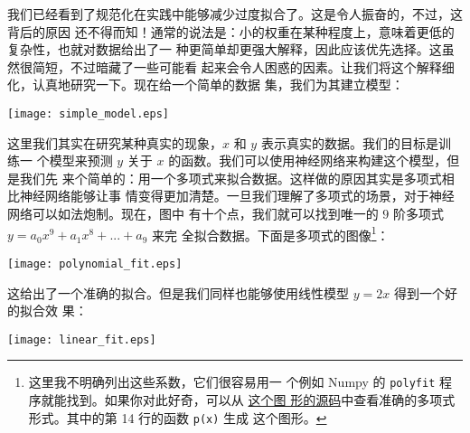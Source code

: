 %
%
% 

我们已经看到了规范化在实践中能够减少过度拟合了。这是令人振奋的，不过，这背后的原因
还不得而知！通常的说法是：小的权重在某种程度上，意味着更低的复杂性，也就对数据给出了一
种更简单却更强大解释，因此应该优先选择。这虽然很简短，不过暗藏了一些可能看
起来会令人困惑的因素。让我们将这个解释细化，认真地研究一下。现在给一个简单的数据
集，我们为其建立模型：
\begin{center}
	\texttt{[image: simple\_model.eps]}
\end{center}
	
这里我们其实在研究某种真实的现象，$x$ 和 $y$ 表示真实的数据。我们的目标是训练一
个模型来预测 $y$ 关于 $x$ 的函数。我们可以使用神经网络来构建这个模型，但是我们先
来个简单的：用一个多项式来拟合数据。这样做的原因其实是多项式相比神经网络能够让事
情变得更加清楚。一旦我们理解了多项式的场景，对于神经网络可以如法炮制。现在，图中
有十个点，我们就可以找到唯一的 $9$ 阶多项式 $y=a_0x^9 + a_1x^8 + ... + a_9$ 来完
全拟合数据。下面是多项式的图像\footnote{这里我不明确列出这些系数，它们很容易用一
  个例如 Numpy 的 \lstinline!polyfit! 程序就能找到。如果你对此好奇，可以从%
  \href{http://neuralnetworksanddeeplearning.com/js/polynomial_model.js}{这个图
    形的源码}中查看准确的多项式形式。其中的第 14 行的函数 \lstinline!p(x)! 生成
  这个图形。}：
\begin{center}
	\texttt{[image: polynomial\_fit.eps]}
\end{center}

这给出了一个准确的拟合。但是我们同样也能够使用线性模型 $y=2x$ 得到一个好的拟合效
果：
\begin{center}
	\texttt{[image: linear\_fit.eps]}
\end{center}

